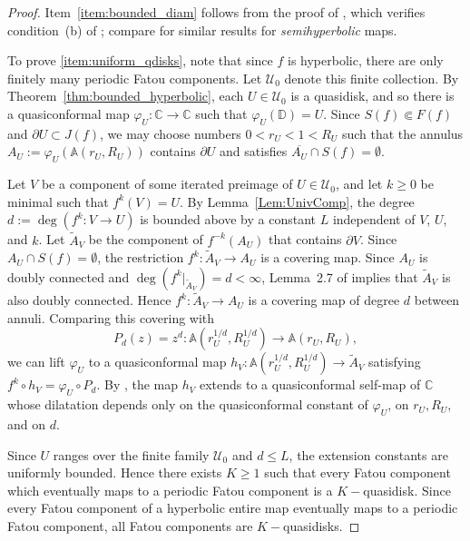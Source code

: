 \documentclass[11pt,a4paper, oneside]{amsart}
\theoremstyle{definition}
\theoremstyle{remark}
\numberwithin{equation}{section}
\newcommand{\A}{\mathbb{A}}
\def\D{{\mathbb{D}}}
\renewcommand{\geq}{\geqslant}
\renewcommand{\leq}{\leqslant}
\newcommand{\C}{\mathbb{C}}
\renewcommand{\phi}{\varphi}
\begin{document}
\begin{proof}
Item~\eqref{item:bounded_diam} follows from the proof of \cite[Theorem~2.5]{BFR15_hyperbolic}, which verifies condition~(b) of \cite[Lemma~2.3]{BFR15_hyperbolic}; compare \cite{Bergweiler_morosawa} for similar results for \textit{semihyperbolic} maps.
		
To prove \eqref{item:uniform_qdisks}, note that since $f$ is hyperbolic, there are only finitely many periodic
Fatou components. Let $\mathcal U_0$ denote this finite collection. By
Theorem~\ref{thm:bounded_hyperbolic}, each $U \in \mathcal U_0$ is a quasidisk, and so there is a quasiconformal map $\phi_U\colon\C\to\C$ such that $\phi_U(\D)=U$. Since $S(f)\Subset F(f)$ and $\partial U\subset J(f)$, we may choose
numbers $0<r_U<1<R_U$ such that the annulus
$A_U:=\phi_U(\A(r_U,R_U))$
contains $\partial U$ and satisfies $\overline{A_U}\cap S(f)=\emptyset.$

Let $V$ be a component of some iterated preimage of $U\in\mathcal U_0$, and let $k\geq0$ be minimal such that $f^k(V)=U$. By
Lemma~\ref{Lem:UnivComp}, the degree $d:=\deg(f^k\colon V\to U)$
is bounded above by a constant $L$ independent of $V$, $U$, and $k$. Let $\widetilde A_V$ be the component of $f^{-k}(A_U)$ that contains
$\partial V$. Since $A_U\cap S(f)=\emptyset$, the restriction $f^k:\widetilde A_V\to A_U$ is a covering map. Since $A_U$ is doubly connected and $\deg(f^k|_{\widetilde A_V})=d<\infty$, Lemma~2.7 of
\cite{BFR15_hyperbolic} implies that $\widetilde A_V$ is also doubly
connected. Hence $f^k:\widetilde A_V\to A_U$ is a covering map of degree $d$ between annuli. Comparing this covering with
\[
P_d(z)=z^d\colon \A(r_U^{1/d},R_U^{1/d})\to \A(r_U,R_U),
\]
we can lift $\phi_U$ to a quasiconformal map $h_V\colon \A(r_U^{1/d},R_U^{1/d})\to \widetilde A_V$
satisfying $f^k\circ h_V=\phi_U\circ P_d.$ By \cite[Lemma~3.8]{EFGP24}, the map $h_V$ extends to a quasiconformal
self-map of $\C$ whose dilatation depends only on the quasiconformal constant
of $\phi_U$, on $r_U,R_U$, and on $d$.

Since $U$ ranges over the finite family $\mathcal U_0$ and $d\leq L$, the extension constants are uniformly bounded. Hence
there exists $K\geq1$ such that every Fatou component which eventually maps to
a periodic Fatou component is a $K-$quasidisk. Since every Fatou component of
a hyperbolic entire map eventually maps to a periodic Fatou component, all
Fatou components are $K-$quasidisks.
\end{proof}

\end{document}
